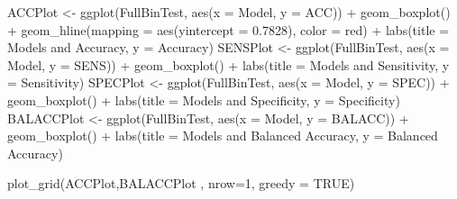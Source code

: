 \documentclass[
]{article}
\newenvironment{Shaded}{\begin{snugshade}}{\end{snugshade}}
\newcommand{\AttributeTok}[1]{\textcolor[rgb]{0.77,0.63,0.00}{#1}}
\newcommand{\ConstantTok}[1]{\textcolor[rgb]{0.00,0.00,0.00}{#1}}
\newcommand{\DecValTok}[1]{\textcolor[rgb]{0.00,0.00,0.81}{#1}}
\newcommand{\FloatTok}[1]{\textcolor[rgb]{0.00,0.00,0.81}{#1}}
\newcommand{\FunctionTok}[1]{\textcolor[rgb]{0.00,0.00,0.00}{#1}}
\newcommand{\NormalTok}[1]{#1}
\newcommand{\OtherTok}[1]{\textcolor[rgb]{0.56,0.35,0.01}{#1}}
\newcommand{\SpecialCharTok}[1]{\textcolor[rgb]{0.00,0.00,0.00}{#1}}
\newcommand{\StringTok}[1]{\textcolor[rgb]{0.31,0.60,0.02}{#1}}
\begin{document}
\begin{Shaded}
\begin{Highlighting}[]
\NormalTok{ACCPlot }\OtherTok{\textless{}{-}} \FunctionTok{ggplot}\NormalTok{(FullBinTest, }\FunctionTok{aes}\NormalTok{(}\AttributeTok{x =}\NormalTok{ Model, }\AttributeTok{y =}\NormalTok{ ACC)) }\SpecialCharTok{+} \FunctionTok{geom\_boxplot}\NormalTok{() }\SpecialCharTok{+} 
  \FunctionTok{geom\_hline}\NormalTok{(}\AttributeTok{mapping =} \FunctionTok{aes}\NormalTok{(}\AttributeTok{yintercept =} \FloatTok{0.7828}\NormalTok{), }\AttributeTok{color =} \StringTok{\textquotesingle{}red\textquotesingle{}}\NormalTok{) }\SpecialCharTok{+} 
  \FunctionTok{labs}\NormalTok{(}\AttributeTok{title =} \StringTok{\textquotesingle{}Models and Accuracy\textquotesingle{}}\NormalTok{, }\AttributeTok{y =} \StringTok{\textquotesingle{}Accuracy\textquotesingle{}}\NormalTok{)}
\NormalTok{SENSPlot }\OtherTok{\textless{}{-}} \FunctionTok{ggplot}\NormalTok{(FullBinTest, }\FunctionTok{aes}\NormalTok{(}\AttributeTok{x =}\NormalTok{ Model, }\AttributeTok{y =}\NormalTok{ SENS)) }\SpecialCharTok{+} \FunctionTok{geom\_boxplot}\NormalTok{() }\SpecialCharTok{+}
  \FunctionTok{labs}\NormalTok{(}\AttributeTok{title =} \StringTok{\textquotesingle{}Models and Sensitivity\textquotesingle{}}\NormalTok{, }\AttributeTok{y =} \StringTok{\textquotesingle{}Sensitivity\textquotesingle{}}\NormalTok{)}
\NormalTok{SPECPlot }\OtherTok{\textless{}{-}} \FunctionTok{ggplot}\NormalTok{(FullBinTest, }\FunctionTok{aes}\NormalTok{(}\AttributeTok{x =}\NormalTok{ Model, }\AttributeTok{y =}\NormalTok{ SPEC)) }\SpecialCharTok{+} \FunctionTok{geom\_boxplot}\NormalTok{() }\SpecialCharTok{+}
  \FunctionTok{labs}\NormalTok{(}\AttributeTok{title =} \StringTok{\textquotesingle{}Models and Specificity\textquotesingle{}}\NormalTok{, }\AttributeTok{y =} \StringTok{\textquotesingle{}Specificity\textquotesingle{}}\NormalTok{)}
\NormalTok{BALACCPlot }\OtherTok{\textless{}{-}} \FunctionTok{ggplot}\NormalTok{(FullBinTest, }\FunctionTok{aes}\NormalTok{(}\AttributeTok{x =}\NormalTok{ Model, }\AttributeTok{y =}\NormalTok{ BALACC)) }\SpecialCharTok{+} \FunctionTok{geom\_boxplot}\NormalTok{() }\SpecialCharTok{+} 
  \FunctionTok{labs}\NormalTok{(}\AttributeTok{title =} \StringTok{\textquotesingle{}Models and Balanced Accuracy\textquotesingle{}}\NormalTok{, }\AttributeTok{y =} \StringTok{\textquotesingle{}Balanced Accuracy\textquotesingle{}}\NormalTok{)}

\FunctionTok{plot\_grid}\NormalTok{(ACCPlot,BALACCPlot , }\AttributeTok{nrow=}\DecValTok{1}\NormalTok{, }\AttributeTok{greedy =} \ConstantTok{TRUE}\NormalTok{)}
\end{Highlighting}
\end{Shaded}
\end{document}
